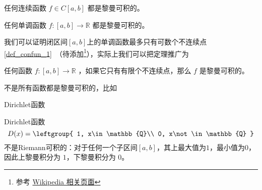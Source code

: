 \begin{theorem}{}
任何连续函数 $f \in C[a, b]$ 都是黎曼可积的。
\end{theorem}

\begin{theorem}{}
任何单调函数 $f: [a, b] \to \mathbb{R}$ 都是黎曼可积的。
\end{theorem}

我们可以证明闭区间$[a, b]$上的单调函数最多只有可数个不连续点\autoref{def_confun_1}~（待添加\footnote{参考 \href{https://en.wikipedia.org/wiki/Discontinuities_of_monotone_functions}{Wikipedia 相关页面}}），实际上我们可以把定理推广为

\begin{theorem}{}
任何函数 $f: [a, b] \to \mathbb{R}$ ，如果它只有有限个不连续点，那么 $f$ 是黎曼可积的。
\end{theorem}





不是所有函数都是黎曼可积的，比如

\begin{example}{Dirichlet函数}

Dirichlet函数
\begin{equation}
D(x)=
\leftgroup{
    1, x\in\mathbb{Q}\\
    0, x\not\in\mathbb{Q}
}
\end{equation}
不是Riemann可积的：对于任何一个子区间$[a, b]$，其上最大值为$1$，最小值为$0$，因此上黎曼积分为 $1$，下黎曼积分为 $0$。
\end{example}
